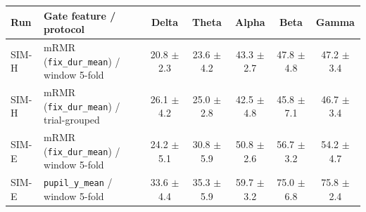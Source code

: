 \begin{tabular}{@{}llccccc@{}}
\toprule
Run & Gate feature / protocol & Delta & Theta & Alpha & Beta & Gamma\\
\midrule
SIM-H & mRMR (\texttt{fix\_dur\_mean}) / window 5-fold & 20.8 $\pm$ 2.3 & 23.6 $\pm$ 4.2 & 43.3 $\pm$ 2.7 & 47.8 $\pm$ 4.8 & 47.2 $\pm$ 3.4\\
SIM-H & mRMR (\texttt{fix\_dur\_mean}) / trial-grouped & 26.1 $\pm$ 4.2 & 25.0 $\pm$ 2.8 & 42.5 $\pm$ 4.8 & 45.8 $\pm$ 7.1 & 46.7 $\pm$ 3.4\\
SIM-E & mRMR (\texttt{fix\_dur\_mean}) / window 5-fold & 24.2 $\pm$ 5.1 & 30.8 $\pm$ 5.9 & 50.8 $\pm$ 2.6 & 56.7 $\pm$ 3.2 & 54.2 $\pm$ 4.7\\
SIM-E & \texttt{pupil\_y\_mean} / window 5-fold & 33.6 $\pm$ 4.4 & 35.3 $\pm$ 5.9 & 59.7 $\pm$ 3.2 & 75.0 $\pm$ 6.8 & 75.8 $\pm$ 2.4\\
\bottomrule
\end{tabular}
